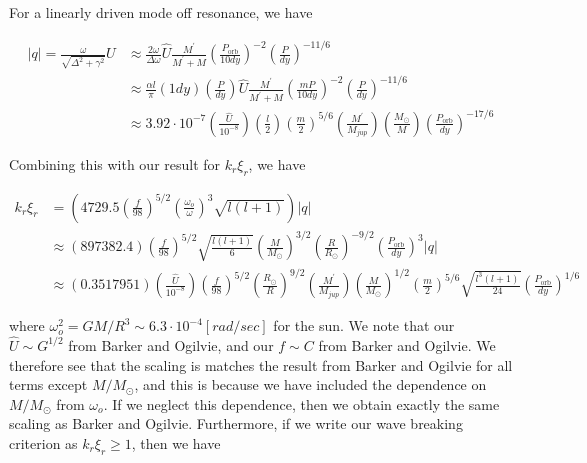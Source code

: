 For a linearly driven mode off resonance, we have

\begin{subequations}
\begin{align}
|q| = \frac{\omega}{\sqrt{\Delta^2 + \gamma^2}} U & \approx \frac{2\omega}{\Delta \omega} \hat{U} \frac{M^\prime}{M^\prime + M} \left( \frac{P_\mathrm{orb}}{10dy} \right)^{-2} \left(\frac{P}{dy}\right)^{-11/6} \\
    & \approx \frac{\alpha l}{\pi}(1dy) \left(\frac{P}{dy}\right) \hat{U}  \frac{M^\prime}{M^\prime + M} \left( \frac{m P}{10dy} \right)^{-2} \left(\frac{P}{dy}\right)^{-11/6} \\
    & \approx 3.92\cdot10^{-7} \left(\frac{\hat{U}}{10^{-8}}\right)\left(\frac{l}{2}\right) \left( \frac{m}{2}\right)^{5/6} \left(\frac{M^\prime}{M_{jup}}\right)\left(\frac{M_\odot}{M}\right)\left(\frac{P_\mathrm{orb}}{dy}\right)^{-17/6}
\end{align}
\end{subequations}

Combining this with our result for $k_r\xi_r$, we have 

\begin{subequations}
\begin{align}
k_r\xi_r & = \left( 4729.5 \left(\frac{f}{98}\right)^{5/2} \left(\frac{\omega_o}{\omega}\right)^3 \sqrt{l(l+1)}\right) |q| \\
& \approx \left(897382.4\right)\left(\frac{f}{98}\right)^{5/2} \sqrt{\frac{l(l+1)}{6}} \left(\frac{M}{M_\odot}\right)^{3/2} \left(\frac{R}{R_\odot}\right)^{-9/2} \left(\frac{P_\mathrm{orb}}{dy}\right)^3 |q| \\
& \approx (0.3517951)\left(\frac{\hat{U}}{10^{-8}}\right) \left(\frac{f}{98}\right)^{5/2} \left(\frac{R_\odot}{R}\right)^{9/2} \left(\frac{M^\prime}{M_{jup}}\right) \left(\frac{M}{M_\odot}\right)^{1/2} \left(\frac{m}{2}\right)^{5/6} \sqrt{\frac{l^3(l+1)}{24}} \left(\frac{P_\mathrm{orb}}{dy}\right)^{1/6} 
\end{align}
\end{subequations}

where $\omega_o^2 = GM/R^3 \sim 6.3\cdot10^{-4} [rad/sec]$ for the sun. We note that our $\hat{U}\sim G^{1/2}$ from Barker and Ogilvie, and our $f\sim C$ from Barker and Ogilvie. We therefore see that the scaling is matches the result from Barker and Ogilvie for all terms except $M/M_\odot$, and this is because we have included the dependence on $M/M_\odot$ from $\omega_o$. If we neglect this dependence, then we obtain exactly the same scaling as Barker and Ogilvie. Furthermore, if we write our wave breaking criterion as $k_r\xi_r\geq1$, then we have

